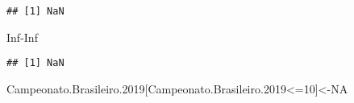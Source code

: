 \documentclass[
]{book}
\newenvironment{Shaded}{\begin{snugshade}}{\end{snugshade}}
\newcommand{\ConstantTok}[1]{\textcolor[rgb]{0.00,0.00,0.00}{#1}}
\newcommand{\DecValTok}[1]{\textcolor[rgb]{0.00,0.00,0.81}{#1}}
\newcommand{\FloatTok}[1]{\textcolor[rgb]{0.00,0.00,0.81}{#1}}
\newcommand{\NormalTok}[1]{#1}
\newcommand{\OtherTok}[1]{\textcolor[rgb]{0.56,0.35,0.01}{#1}}
\newcommand{\SpecialCharTok}[1]{\textcolor[rgb]{0.00,0.00,0.00}{#1}}
\begin{document}
\begin{verbatim}
## [1] NaN
\end{verbatim}

\begin{Shaded}
\begin{Highlighting}[]
\ConstantTok{Inf}\SpecialCharTok{{-}}\ConstantTok{Inf}
\end{Highlighting}
\end{Shaded}

\begin{verbatim}
## [1] NaN
\end{verbatim}

\begin{Shaded}
\begin{Highlighting}[]
\NormalTok{Campeonato.Brasileiro}\FloatTok{.2019}\NormalTok{[Campeonato.Brasileiro}\FloatTok{.2019}\SpecialCharTok{\textless{}=}\DecValTok{10}\NormalTok{]}\OtherTok{\textless{}{-}}\ConstantTok{NA}
\end{Highlighting}
\end{Shaded}
\end{document}
